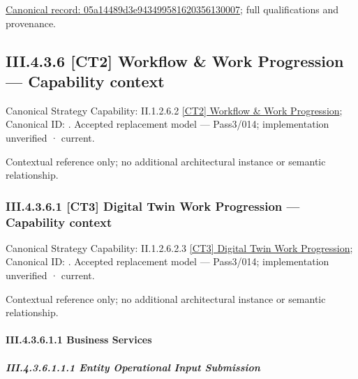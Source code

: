 {\footnotesize \href{../../../../../../../../continuum/business/business-function/05a14489d3e943499581620356130007.md}{Canonical record: 05a14489d3e943499581620356130007}; full qualifications and provenance.}\par
\subsection*{III.4.3.6 [CT2] Workflow \& Work Progression — Capability context}
\label{navigation:III.4.3.6}

{\small Canonical Strategy Capability: II.1.2.6.2 \hyperref[element:2813ee6e848a467ab77fc34108807c26]{[CT2] Workflow \& Work Progression}; Canonical ID: \texttt{}. Accepted replacement model — Pass3/014; implementation unverified · current.}\par
Contextual reference only; no additional architectural instance or semantic relationship.\par
\subsubsection*{III.4.3.6.1 [CT3] Digital Twin Work Progression — Capability context}
\label{navigation:III.4.3.6.1}

{\small Canonical Strategy Capability: II.1.2.6.2.3 \hyperref[element:251ce46fb18d4398ad49296eeea73bbc]{[CT3] Digital Twin Work Progression}; Canonical ID: \texttt{}. Accepted replacement model — Pass3/014; implementation unverified · current.}\par
Contextual reference only; no additional architectural instance or semantic relationship.\par
\paragraph*{III.4.3.6.1.1 Business Services}
\label{navigation:III.4.3.6.1.1}

\subparagraph*{III.4.3.6.1.1.1 Entity Operational Input Submission}
\label{navigation:III.4.3.6.1.1.1}

